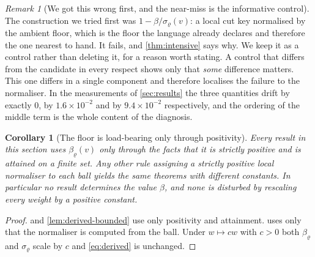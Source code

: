 \documentclass[11pt,twocolumn,a4paper]{article}
\theoremstyle{plain}
\newtheorem{corollary}[theorem]{Corollary}
\theoremstyle{definition}
\theoremstyle{remark}
\newtheorem{remark}[theorem]{Remark}
\newcommand{\wt}{w}
\newcommand{\flo}{\beta}
\newcommand{\sepc}{\sigma}
\newcommand{\rad}{\varrho}
\begin{document}
\begin{remark}[We got this wrong first, and the near-miss is the informative
control]
\label{rem:nearmiss}
The construction we tried first was $1-\flo/\sepc_\rad(v)$: a local cut key
normalised by the ambient floor, which is the floor the language already
declares and therefore the one nearest to hand. It fails, and
\cref{thm:intensive} says why. We keep it as a control rather than deleting it,
for a reason worth stating. A control that differs from the candidate in every
respect shows only that \emph{some} difference matters. This one differs in a
single component and therefore localises the failure to the normaliser. In the
measurements of \cref{sec:results} the three quantities drift by exactly $0$,
by $1.6\times10^{-2}$ and by $9.4\times10^{-2}$ respectively, and the ordering
of the middle term is the whole content of the diagnosis.
\end{remark}

\begin{corollary}[The floor is load-bearing only through positivity]
\label{cor:positivity-only}
Every result in this section uses $\flo_\rad(v)$ only through the facts that it
is strictly positive and is attained on a finite set. Any other rule assigning
a strictly positive local normaliser to each ball yields the same theorems with
different constants. In particular no result determines the value $\flo$, and
none is disturbed by rescaling every weight by a positive constant.
\end{corollary}

\begin{proof}
 and \cref{lem:derived-bounded} use only positivity and
attainment.  uses only that the normaliser is computed from
the ball. Under $\wt\mapsto c\wt$ with $c>0$ both $\flo_\rad$ and $\sepc_\rad$
scale by $c$ and \cref{eq:derived} is unchanged.
\end{proof}
\end{document}
